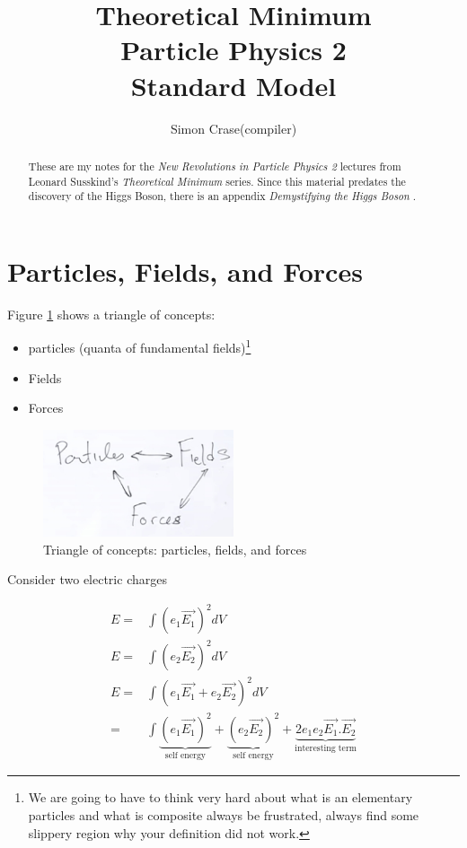 \documentclass[]{article}
\title{Theoretical Minimum\\Particle Physics 2\\Standard Model}
\author{Simon Crase(compiler)}
\begin{document}
\maketitle

\begin{abstract}
These are my notes for the \emph{New Revolutions in Particle Physics 2} lectures from Leonard Susskind's \emph{Theoretical Minimum} series\cite{susskind2009standard}. Since this material predates the discovery of the Higgs Boson, there is an appendix \emph{Demystifying the Higgs Boson} \cite{susskind2010demystifing}.
\end{abstract}

\tableofcontents
\listoffigures
\listoftables
\listoftheorems

\section{Particles, Fields, and Forces}

Figure \ref{fig:particles:fields:forces} shows a triangle of concepts:
\begin{itemize}
	\item particles (quanta of fundamental fields)\footnote{We are going to have to think very hard about what is an elementary particles and what is composite always be frustrated, always find some slippery region why your definition did not work.}
	\item Fields
	\item Forces
\end{itemize}

\begin{figure}[H]
	\begin{center}
		\caption{Triangle of concepts: particles, fields, and forces}\label{fig:particles:fields:forces}
		\includegraphics[width=0.5\textwidth]{ParticlesFieldsForces}
	\end{center}
\end{figure}

Consider two electric charges

\begin{align*}
E=&\int (e_1 \vec{E_1})^2 dV\\
E=&\int (e_2 \vec{E_2})^2 dV\\
E=&\int (e_1\vec{E_1}+e_2 \vec{E_2})^2 dV\\
=&\int \underbrace{(e_1\vec{E_1})^2}_\text{self energy}+ \underbrace{(e_2\vec{E_2})^2}_\text{self energy} + \underbrace{2e_1e_2\vec{E_1}.\vec{E_2}}_\text{interesting term}
\end{align*}
\end{document}

